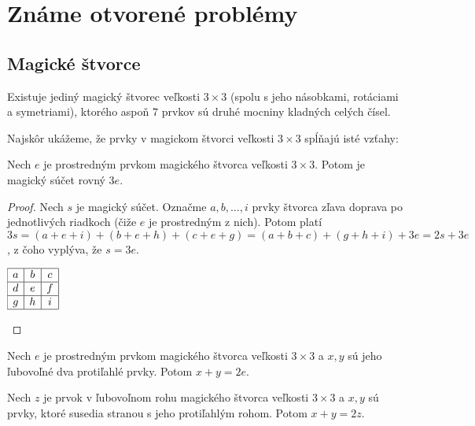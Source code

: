 \chapter{Známe otvorené problémy}

\label{kap:openproblems} %

\section{Magické štvorce}

\begin{hypothesis} Existuje jediný magický štvorec veľkosti $3 \times 3$ (spolu s jeho násobkami, rotáciami a symetriami), ktorého aspoň $7$ prvkov sú druhé mocniny kladných celých čísel.
\end{hypothesis}

Najskôr ukážeme, že prvky v magickom štvorci veľkosti $3 \times 3$ spĺňajú isté vzťahy:

\begin{theorem} Nech $e$ je prostredným prvkom magického štvorca veľkosti $3 \times 3$. Potom je magický súčet rovný $3e$.
\end{theorem}

\begin{proof} Nech $s$ je magický súčet. Označme $a, b, \dots , i$ prvky štvorca zľava doprava po jednotlivých riadkoch (čiže $e$ je prostredným z nich). Potom platí $3s = (a + e + i) + (b + e + h) + (c + e + g) = (a + b + c) + (g + h + i) + 3e = 2s + 3e$, z čoho vyplýva, že $s = 3e$.

\begin{center}
$\begin{array}{ |c|c|c| } 
\hline
a & b & c \\ 
\hline
d & e & f \\ 
\hline
g & h & i \\
\hline
\end{array}$
\end{center}
\end{proof}

\begin{consequence}
\label{square3x3xy}
Nech $e$ je prostredným prvkom magického štvorca veľkosti $3 \times 3$ a $x,y$ sú jeho ľubovoľné dva protiľahlé prvky. Potom $x + y = 2e$.
\end{consequence}

\begin{consequence}
\label{square3x3afh}
Nech $z$ je prvok v ľubovoľnom rohu magického štvorca veľkosti $3 \times 3$ a $x,y$ sú prvky, ktoré susedia stranou s jeho protiľahlým rohom. Potom $x + y = 2z$.
\end{consequence}

